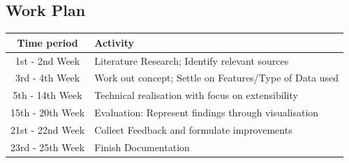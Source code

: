 \documentclass{article}
\begin{document}
\begin{large}
\section{Work Plan}
\begin{table}[!ht]
 \centering
  \begin{tabular}{|c|l|}
  \hline
  \textbf{Time period} & \textbf{Activity} \\ \hline
  	1st - 2nd Week & Literature Research; Identify relevant sources \\ \hline
  	3rd - 4th Week & Work out concept; Settle on Features/Type of Data used  \\ \hline
  	5th - 14th Week & Technical realisation with focus on extensibility \\ \hline
  	15th - 20th Week & Evaluation: Represent findings through visualisation \\ \hline
  	21st - 22nd Week & Collect Feedback and formulate improvements \\ \hline
  	23rd - 25th Week & Finish Documentation \\ \hline
  \end{tabular}
\end{table}

\end{large}

\nocite{*}

\printbibliography
\end{document}
